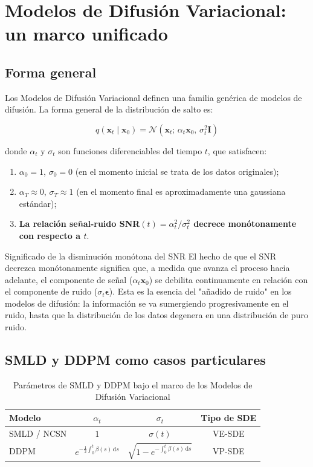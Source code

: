 \section{Modelos de Difusión Variacional: un marco unificado}

\subsection{Forma general}

Los Modelos de Difusión Variacional definen una familia genérica de modelos de difusión. La forma general de la distribución de salto es:

$$
q(\mathbf{x}_t \mid \mathbf{x}_0) = \mathcal{N}\!\left(\mathbf{x}_t;\, \alpha_t \mathbf{x}_0,\, \sigma_t^2 \mathbf{I}\right)
$$

donde $\alpha_t$ y $\sigma_t$ son funciones diferenciables del tiempo $t$, que satisfacen:

\begin{enumerate}
    \item $\alpha_0 = 1$, $\sigma_0 = 0$ (en el momento inicial se trata de los datos originales);
    \item $\alpha_T \approx 0$, $\sigma_T \approx 1$ (en el momento final es aproximadamente una gaussiana estándar);
    \item \textbf{La relación señal-ruido SNR$(t) = \alpha_t^2/\sigma_t^2$ decrece monótonamente con respecto a $t$}.
\end{enumerate}

\begin{importantbox}{Significado de la disminución monótona del SNR}
El hecho de que el SNR decrezca monótonamente significa que, a medida que avanza el proceso hacia adelante, el componente de señal ($\alpha_t \mathbf{x}_0$) se debilita continuamente en relación con el componente de ruido ($\sigma_t \boldsymbol{\epsilon}$). Esta es la esencia del "añadido de ruido" en los modelos de difusión: la información se va sumergiendo progresivamente en el ruido, hasta que la distribución de los datos degenera en una distribución de puro ruido.
\end{importantbox}

\subsection{SMLD y DDPM como casos particulares}

\begin{table}[H]
\centering
\begin{tabular}{lccc}
\toprule
\textbf{Modelo} & $\alpha_t$ & $\sigma_t$ & \textbf{Tipo de SDE} \\
\midrule
SMLD / NCSN & $1$ & $\sigma(t)$ & VE-SDE \\
DDPM & $e^{-\frac{1}{2}\int_0^t \beta(s)\,\mathrm{d}s}$ & $\sqrt{1 - e^{-\int_0^t \beta(s)\,\mathrm{d}s}}$ & VP-SDE \\
\bottomrule
\end{tabular}
\caption{Parámetros de SMLD y DDPM bajo el marco de los Modelos de Difusión Variacional}
\end{table}

